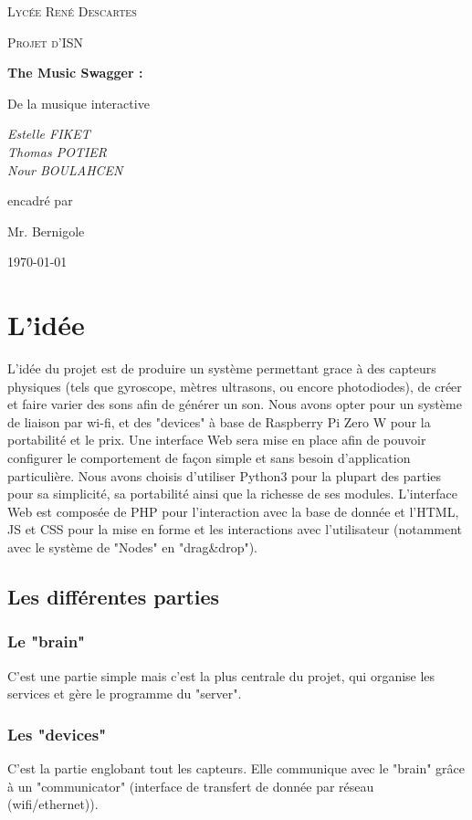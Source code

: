 \documentclass[12pt]{article}
\begin{document}
	\begin{titlepage}
		\centering
		{\scshape\LARGE Lycée René Descartes \par}
		\vspace{1cm}
		{\scshape\Large Projet d'ISN\par}
		\vspace{1.5cm}
		{\huge\bfseries The Music Swagger :\par De la musique interactive\par}
		\vspace{2cm}
		{\Large\itshape Estelle FIKET\\Thomas POTIER\\Nour BOULAHCEN\par}
		\vfill
		encadré par\par
		Mr. Bernigole
		
		\vfill
		
		{\large \today\par}
	\end{titlepage}
	\tableofcontents
	\newpage
	\section{L'idée}
	L'idée du projet est de produire un système permettant grace à des capteurs physiques (tels que gyroscope, mètres ultrasons, ou encore photodiodes), de créer et faire varier des sons afin de générer un son. Nous avons opter pour un système de liaison par wi-fi, et des "devices" à base de Raspberry Pi Zero W pour la portabilité et le prix. Une interface Web sera mise en place afin de pouvoir configurer le comportement de façon simple et sans besoin d'application particulière. Nous avons choisis d'utiliser Python3 pour la plupart des parties pour sa simplicité, sa portabilité ainsi que la richesse de ses modules. L'interface Web est composée de PHP pour l'interaction avec la base de donnée et l'HTML, JS et CSS pour la mise en forme et les interactions avec l'utilisateur (notamment avec le système de "Nodes" en "drag\&drop").
	\subsection{Les différentes parties}
	\subsubsection{Le "brain"}
	C'est une partie simple mais c'est la plus centrale du projet, qui organise les services et gère le programme du "server".
	\subsubsection{Les "devices"}
	C'est la partie englobant tout les capteurs. Elle communique avec le "brain" grâce à un "communicator" (interface de transfert de donnée par réseau (wifi/ethernet)).
\end{document}
